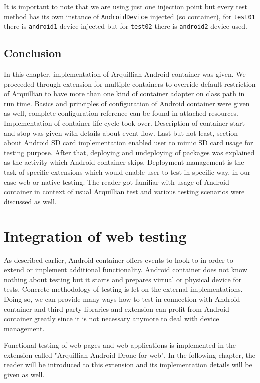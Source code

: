 \documentclass[12pt,final,oneside]{fithesis}
\begin{document}
It is important to note that we are using just one injection point but every test method has its own instance of \texttt{AndroidDevice} injected (so container), for \texttt{test01} there is \texttt{android1} device injected but for \texttt{test02} there is \texttt{android2} device used.

	\section{Conclusion}

In this chapter, implementation of Arquillian Android container was given. We proceeded through extension for multiple containers to override default restriction of Arquillian to have more than one kind of container adapter on class path in run time. Basics and principles of configuration of Android container were given as well, complete configuration reference can be found in attached resources. Implementation of container life cycle took over. Description of container start and stop was given with details about event flow. Last but not least, section about Android SD card implementation enabled user to mimic SD card usage for testing purpose. After that, deploying and undeploying of packages was explained as the activity which Android container skips. Deployment management is the task of specific extensions which would enable user to test in specific way, in our case web or native testing. The reader got familiar with usage of Android container in context of usual Arquillian test and various testing scenarios were discussed as well.

\chapter{Integration of web testing}

As described earlier, Android container offers events to hook to in order to extend or implement additional functionality. Android container does not know nothing about testing but it starts and prepares virtual or physical device for tests. Concrete methodology of testing is let on the external implementations. Doing so, we can provide many ways how to test in connection with Android container and third party libraries and extension can profit from Android container greatly since it is not necessary anymore to deal with device management.

Functional testing of web pages and web applications is implemented in the extension called "Arquillian Android Drone for web". In the following chapter, the reader will be introduced to this extension and its implementation details will be given as well.
\end{document}
